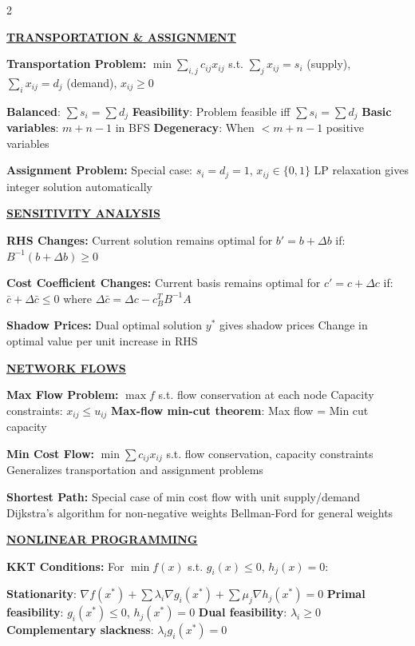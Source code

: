 \documentclass[8pt,a4paper,landscape]{article}
\newcommand{\mysection}[1]{\textbf{\underline{#1}}}
\newcommand{\mysubsection}[1]{\textbf{#1:}}
\begin{document}
\begin{multicols}{2}

\mysection{TRANSPORTATION \& ASSIGNMENT}

\mysubsection{Transportation Problem}
$\min \sum_{i,j} c_{ij}x_{ij}$
s.t. $\sum_j x_{ij} = s_i$ (supply), $\sum_i x_{ij} = d_j$ (demand), $x_{ij} \geq 0$

\textbf{Balanced}: $\sum s_i = \sum d_j$
\textbf{Feasibility}: Problem feasible iff $\sum s_i = \sum d_j$
\textbf{Basic variables}: $m + n - 1$ in BFS
\textbf{Degeneracy}: When $< m + n - 1$ positive variables

\mysubsection{Assignment Problem}
Special case: $s_i = d_j = 1$, $x_{ij} \in \{0,1\}$
LP relaxation gives integer solution automatically

\mysection{SENSITIVITY ANALYSIS}

\mysubsection{RHS Changes}
Current solution remains optimal for $b' = b + \Delta b$ if:
$B^{-1}(b + \Delta b) \geq 0$

\mysubsection{Cost Coefficient Changes}
Current basis remains optimal for $c' = c + \Delta c$ if:
$\bar{c} + \Delta \bar{c} \leq 0$ where $\Delta \bar{c} = \Delta c - c_B^TB^{-1}A$

\mysubsection{Shadow Prices}
Dual optimal solution $y^*$ gives shadow prices
Change in optimal value per unit increase in RHS

\mysection{NETWORK FLOWS}

\mysubsection{Max Flow Problem}
$\max f$ s.t. flow conservation at each node
Capacity constraints: $x_{ij} \leq u_{ij}$
\textbf{Max-flow min-cut theorem}: Max flow = Min cut capacity

\mysubsection{Min Cost Flow}
$\min \sum c_{ij}x_{ij}$ s.t. flow conservation, capacity constraints
Generalizes transportation and assignment problems

\mysubsection{Shortest Path}
Special case of min cost flow with unit supply/demand
Dijkstra's algorithm for non-negative weights
Bellman-Ford for general weights

\mysection{NONLINEAR PROGRAMMING}

\mysubsection{KKT Conditions}
For $\min f(x)$ s.t. $g_i(x) \leq 0$, $h_j(x) = 0$:

\textbf{Stationarity}: $\nabla f(x^*) + \sum \lambda_i \nabla g_i(x^*) + \sum \mu_j \nabla h_j(x^*) = 0$
\textbf{Primal feasibility}: $g_i(x^*) \leq 0$, $h_j(x^*) = 0$
\textbf{Dual feasibility}: $\lambda_i \geq 0$
\textbf{Complementary slackness}: $\lambda_i g_i(x^*) = 0$


\end{multicols}
\end{document}
